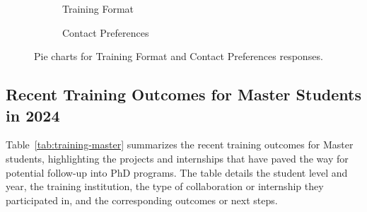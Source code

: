 \begin{figure}[htbp]
    \centering
    \begin{subfigure}[b]{0.4\textwidth}
      \centering
      \caption{Training Format}
      \label{fig:training-format}
    \end{subfigure}
    \hfill
    \begin{subfigure}[b]{0.4\textwidth}
      \centering
      \caption{Contact Preferences}
      \label{fig:contact-preferences}
    \end{subfigure}
    \caption{Pie charts for Training Format and Contact Preferences responses.}
    \label{fig:pie-charts}
  \end{figure}

    \subsection{Recent Training Outcomes for Master Students in 2024}
    \label{sec:training-master}


    Table~\ref{tab:training-master} summarizes the recent training outcomes for Master students, highlighting the projects and internships that have paved the way for potential follow-up into PhD programs. 
    The table details the student level and year, the training institution, the type of collaboration or internship they participated in, and the corresponding outcomes or next steps.

